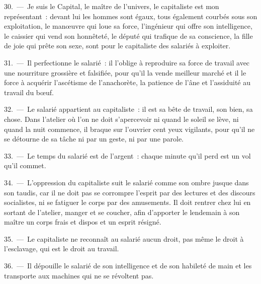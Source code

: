 \documentclass[french,twoside]{book} %
\begin{document}
30. — Je suis le Capital, le maître de l’univers, le capitaliste est mon représentant : devant lui les hommes sont égaux, tous également courbés sous son exploitation, le manœuvre qui loue sa force, l’ingénieur qui offre son intelligence, le caissier qui vend son honnêteté, le député qui trafique de sa conscience, la fille de joie qui prête son sexe, sont pour le capitaliste des salariés à exploiter.\par
31. — Il perfectionne le salarié : il l’oblige à reproduire sa force de travail avec une nourriture grossière et falsifiée, pour qu’il la vende meilleur marché et il le force à acquérir l’ascétisme de l’anachorète, la patience de l’âne et l’assiduité au travail du bœuf.\par
32. — Le salarié appartient au capitaliste : il est sa bête de travail, son bien, sa chose. Dans l’atelier où l’on ne doit s’apercevoir ni quand le soleil se lève, ni quand la nuit commence, il braque sur l’ouvrier cent yeux vigilants, pour qu’il ne se détourne de sa tâche ni par un geste, ni par une parole.\par
33. — Le temps du salarié est de l’argent : chaque minute qu’il perd est un vol qu’il commet.\par
34. — L'oppression du capitaliste suit le salarié comme son ombre jusque dans son taudis, car il ne doit pas se corrompre l’esprit par des lectures et des discours socialistes, ni se fatiguer le corps par des amusements. Il doit rentrer chez lui en sortant de l’atelier, manger et se coucher, afin d’apporter le lendemain à son maître un corps frais et dispos et un esprit résigné.\par
35. — Le capitaliste ne reconnaît au salarié aucun droit, pas même le droit à l’esclavage, qui est le droit au travail.\par
36. — Il dépouille le salarié de son intelligence et de son habileté de main et les transporte aux machines qui ne se révoltent pas.
\end{document}
